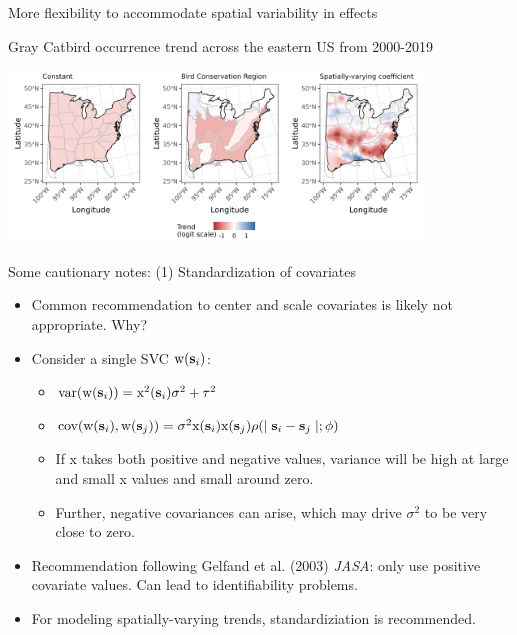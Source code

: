 \begin{frame}{More flexibility to accommodate spatial variability in effects}

Gray Catbird occurrence trend across the eastern US from 2000-2019

\begin{center}
   \includegraphics[width=11cm]{../figures/DKFSWZ22-GRCA-plot.png}
\end{center}
\end{frame}

\begin{frame}{Some cautionary notes: (1) Standardization of covariates}
     \begin{itemize}
          \item Common recommendation to center and scale covariates is likely not appropriate. Why? \pause
	  \item Consider a single SVC $\text{w}(\textbf{s}_i)$: \pause
               \begin{itemize}
		       \item $\text{var}(\text{w}(\textbf{s}_i)) = \text{x}^2(\textbf{s}_i)\sigma^2 + \tau^2$ \pause
		       \item $\text{cov}(\text{w}(\textbf{s}_i), \text{w}(\textbf{s}_j)) = \sigma^2\text{x}(\textbf{s}_i)\text{x}(\textbf{s}_j)\rho(\mid\textbf{s}_i - \textbf{s}_j\mid; \phi)$ \pause
		       \item If x takes both positive and negative values, variance will be high at large and small x values and small around zero. \pause
		       \item Further, negative covariances can arise, which may drive $\sigma^2$ to be very close to zero. \pause
               \end{itemize}
       \item Recommendation following Gelfand et al. (2003) \textit{JASA}: only use positive covariate values. Can lead to identifiability problems.
       \item For modeling spatially-varying trends, standardiziation is recommended. 
     \end{itemize}
\end{frame}

